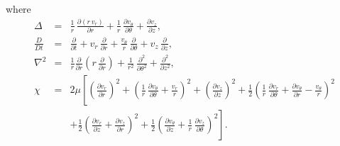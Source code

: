 where 
\begin{eqnarray}
\Delta&=&\frac{1}{r}\,\frac{\partial (r\,v_r)}{\partial r} +\frac{1}{r}\, \frac{\partial v_\theta}{\partial \theta} + \frac{\partial v_z}{\partial z},\\[0.5ex]
\frac{D}{Dt} &=& \frac{\partial}{\partial t} + v_r\,\frac{\partial }{\partial r} + \frac{v_\theta}{r}\,\frac{\partial}{\partial \theta} + v_z\,\frac{\partial}{\partial z},\\[0.5ex]
\nabla^2 &=&\frac{1}{r}\frac{\partial}{\partial r}\!\left(r\,\frac{\partial}{\partial r} \right)+\frac{1}{r^2}\, \frac{\partial^2}{\partial \theta^2}+\frac{\partial^2}{\partial z^2},\\[0.5ex]
\chi &=&2\mu\left[\left(\frac{\partial v_r}{\partial r}\right)^2+\left(\frac{1}{r}\,\frac{\partial v_\theta}{\partial \theta}+\frac{v_r}{r}\right)^2+
\left(\frac{\partial v_z}{\partial z}\right)^2+\frac{1}{2}\left(\frac{1}{r}\,\frac{\partial v_r}{\partial \theta}+\frac{\partial v_\theta}{\partial r}-\frac{v_\theta}{r}\right)^2\right.\nonumber\\[0.5ex]
&&\left.+\frac{1}{2}\left(\frac{\partial v_r}{\partial z}+\frac{\partial v_z}{\partial r}\right)^2+\frac{1}{2}\left(\frac{\partial v_\theta}{\partial z}+\frac{1}{r}\,\frac{\partial v_z}{\partial \theta}\right)^2\right].
\end{eqnarray}


